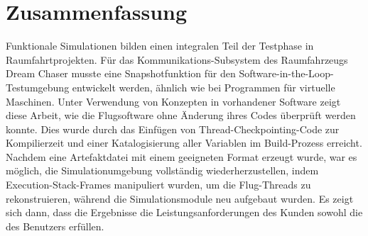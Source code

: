 \chapter*{Zusammenfassung}\label{cha:zusammenfassung}
Funktionale Simulationen bilden einen integralen Teil der Testphase in Raumfahrtprojekten. Für das Kommunikations-Subsystem des Raumfahrzeugs Dream Chaser musste eine Snapshotfunktion für den Software-in-the-Loop-Testumgebung entwickelt werden, ähnlich wie bei Programmen für virtuelle Maschinen. Unter Verwendung von Konzepten in vorhandener Software zeigt diese Arbeit, wie die Flugsoftware ohne Änderung ihres Codes überprüft werden konnte. Dies wurde durch das Einfügen von Thread-Checkpointing-Code zur Kompilierzeit und einer Katalogisierung aller Variablen im Build-Prozess erreicht. Nachdem eine Artefaktdatei mit einem geeigneten Format erzeugt wurde, war es möglich, die Simulationumgebung vollständig wiederherzustellen, indem Execution-Stack-Frames manipuliert wurden, um die Flug-Threads zu rekonstruieren, während die Simulationsmodule neu aufgebaut wurden. Es zeigt sich dann, dass die Ergebnisse die Leistungsanforderungen des Kunden sowohl die des Benutzers erfüllen.